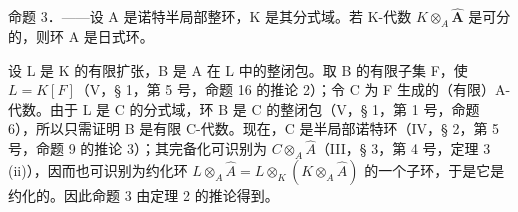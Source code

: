 命题 3．——设 A 是诺特半局部整环，K 是其分式域。若 K-代数 \(K \otimes_{A} \hat{\mathbf{A}}\) 是可分的，则环 A 是日式环。

设 L 是 K 的有限扩张，B 是 A 在 L 中的整闭包。取 B 的有限子集 F，使 \(L = K[F]\)（V，§ 1，第 5 号，命题 16 的推论 2）；令 C 为 F 生成的（有限）A-代数。由于 L 是 C 的分式域，环 B 是 C 的整闭包（V，§ 1，第 1 号，命题 6），所以只需证明 B 是有限 C-代数。现在，C 是半局部诺特环（IV，§ 2，第 5 号，命题 9 的推论 3）；其完备化可识别为 \(C \otimes_{A} \hat{A}\)（III，§ 3，第 4 号，定理 3 (ii)），因而也可识别为约化环 \(L \otimes_{A} \hat{A} = L \otimes_{K} (K \otimes_{A} \hat{A})\) 的一个子环，于是它是约化的。因此命题 3 由定理 2 的推论得到。

